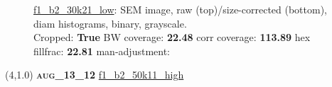 \begin{figure}[h!]
\label{semimg15}
\caption*{\hyperlink{covtableaug_13_12}{\color{blue} \small \ttfamily f1\_b2\_30k21\_low}: SEM image, raw (top)/size-corrected (bottom), diam histograms, binary, grayscale.\\Cropped: {\bf True} \;\; BW coverage: {\bf 22.48} \:\: corr coverage: {\bf 113.89} \:\: hex fillfrac: {\bf 22.81} \:\: man-adjustment: {\bf \color{blue}{Yes}}}
\end{figure}
\newpage

\begin{textblock}{5}(4,1.0)
{\bf \textsc{aug\_13\_12}}
\hspace{4.5cm}
\hyperlink{covtableaug_13_12}{\color{blue} \large \ttfamily f1\_b2\_50k11\_high}
\end{textblock}


